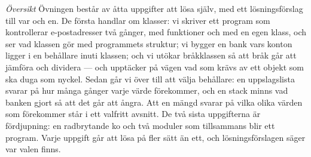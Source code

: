 \emph{Översikt}
Övningen består av åtta uppgifter att lösa själv, med ett
lösningsförslag till var och en.  De första handlar om klasser: vi
skriver ett program som kontrollerar e-postadresser två gånger, med
funktioner och med en egen klass, och ser vad klassen gör med
programmets struktur; vi bygger en bank vars konton ligger i en
behållare inuti klassen; och vi utökar bråkklassen så att bråk går att
jämföra och dividera --- och upptäcker på vägen vad som krävs av ett
objekt som ska duga som nyckel.  Sedan går vi över till att välja
behållare: en uppslagslista svarar på hur många gånger varje värde
förekommer, och en stack minns vad banken gjort så att det går att
ångra.  Att en mängd svarar på vilka olika värden som förekommer står i
ett valfritt avsnitt.  De två sista uppgifterna är fördjupning: en
radbrytande ko och två moduler som tillsammans blir ett program.  Varje
uppgift går att lösa på fler sätt än ett, och lösningsförslagen säger
var valen finns.

